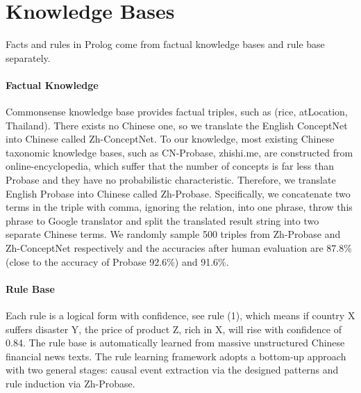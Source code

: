 \section{Knowledge Bases}
Facts and rules in Prolog come from factual knowledge bases and rule base separately.
\paragraph{Factual Knowledge}
Commonsense knowledge base provides factual triples, such as (rice, atLocation, Thailand). There exists no Chinese one, so we translate the English ConceptNet into Chinese called Zh-ConceptNet.
To our knowledge, most existing Chinese taxonomic knowledge bases, such as CN-Probase\cite{Xu2017}, zhishi.me\cite{Niu2011}, are constructed from online-encyclopedia, which suffer that the number of concepts is far less than Probase\cite{Wu2012a} and they have no probabilistic characteristic. Therefore, we translate English Probase into Chinese called Zh-Probase.  
Specifically, we concatenate two terms in the triple with comma, ignoring the relation, into one phrase, throw this phrase to Google translator and split the translated result string into two separate Chinese terms.
We randomly sample 500 triples from Zh-Probase and Zh-ConceptNet respectively and the accuracies after human evaluation are 87.8\%(close to the accuracy of Probase 92.6\%) and 91.6\%.

\paragraph{Rule Base}
Each rule is a logical form with confidence, see rule (1), which means if country X suffers disaster Y, the price of product Z, rich in X, will rise with confidence of 0.84.
The rule base is automatically learned from massive unstructured Chinese financial news texts. 
The rule learning framework adopts a bottom-up approach with two general stages: causal event extraction via the designed patterns\cite{Chang2005} and rule induction via Zh-Probase.	


